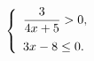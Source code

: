 \begin{ex}[type=ineq_system]
	\begin{condition}
		\( \left\{
		\begin{array}{l}
			\dfrac{3}{4x+5}>0,\vspace{2mm}\\
			3x-8\le0.
		\end{array}
		\right. \)
	\end{condition}
\end{ex}